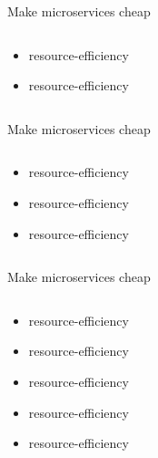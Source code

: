 \documentclass{beamer}
\begin{document}
\begin{frame}{Make microservices cheap}
    \begin{columns}
        \begin{column}{0.36\textwidth}
            \begin{itemize}
                \item resource-efficiency
                \item resource-efficiency
            \end{itemize}
        \end{column}
        \begin{column}{0.36\textwidth}
        \end{column}
        \begin{column}{0.36\textwidth}
        \end{column}
    \end{columns}
\end{frame}
\begin{frame}{Make microservices cheap}
    \begin{columns}
        \begin{column}{0.36\textwidth}
            \begin{itemize}
                \item resource-efficiency
                \item resource-efficiency
                \item resource-efficiency
            \end{itemize}
        \end{column}
        \begin{column}{0.36\textwidth}
        \end{column}
        \begin{column}{0.36\textwidth}
        \end{column}
    \end{columns}
\end{frame}
\begin{frame}{Make microservices cheap}
    \begin{columns}
        \begin{column}{0.36\textwidth}
            \begin{itemize}
                \item resource-efficiency
                \item resource-efficiency
                \item resource-efficiency
                \item resource-efficiency
                \item resource-efficiency
            \end{itemize}
        \end{column}
        \begin{column}{0.36\textwidth}
        \end{column}
        \begin{column}{0.36\textwidth}
        \end{column}
    \end{columns}
\end{frame}
\end{document}

